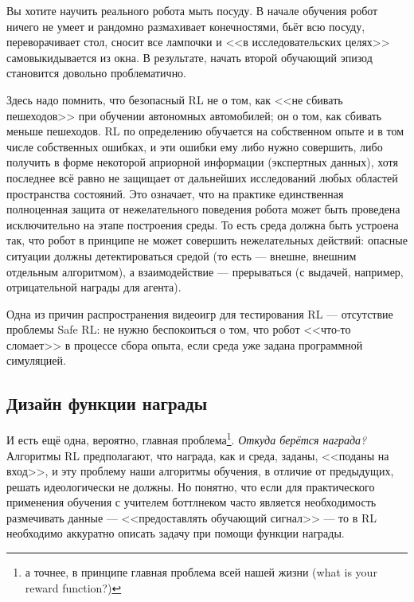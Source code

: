 \begin{example}
Вы хотите научить реального робота мыть посуду. В начале обучения робот ничего не умеет и рандомно размахивает конечностями, бьёт всю посуду, переворачивает стол, сносит все лампочки и <<в исследовательских целях>> самовыкидывается из окна. В результате, начать второй обучающий эпизод становится довольно проблематично.
\end{example}

\begin{remark}
Здесь надо помнить, что безопасный RL не о том, как <<не сбивать пешеходов>> при обучении автономных автомобилей; он о том, как сбивать меньше пешеходов. RL по определению обучается на собственном опыте и в том числе собственных ошибках, и эти ошибки ему либо нужно совершить, либо получить в форме некоторой априорной информации (экспертных данных), хотя последнее всё равно не защищает от дальнейших исследований любых областей пространства состояний. Это означает, что на практике единственная полноценная защита от нежелательного поведения робота может быть проведена исключительно на этапе построения среды. То есть среда должна быть устроена так, что робот в принципе не может совершить нежелательных действий: опасные ситуации должны детектироваться средой (то есть --- внешне, внешним отдельным алгоритмом), а взаимодействие --- прерываться (с выдачей, например, отрицательной награды для агента).
\end{remark}

\begin{remark}
Одна из причин распространения видеоигр для тестирования RL --- отсутствие проблемы Safe RL: не нужно беспокоиться о том, что робот <<что-то сломает>> в процессе сбора опыта, если среда уже задана программной симуляцией.
\end{remark}

\subsection{Дизайн функции награды}

И есть ещё одна, вероятно, главная проблема\footnote{а точнее, в принципе главная проблема всей нашей жизни (what is your reward function?)}. \emph{Откуда берётся награда?} Алгоритмы RL предполагают, что награда, как и среда, заданы, <<поданы на вход>>, и эту проблему наши алгоритмы обучения, в отличие от предыдущих, решать идеологически не должны. Но понятно, что если для практического применения обучения с учителем боттлнеком часто является необходимость размечивать данные --- <<предоставлять обучающий сигнал>> --- то в RL необходимо аккуратно описать задачу при помощи функции награды.

